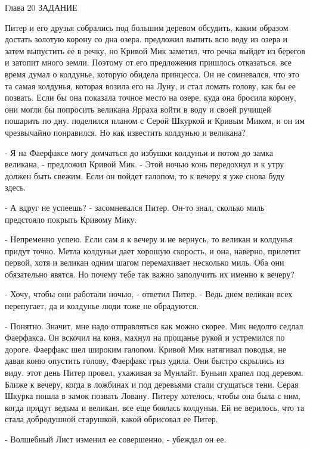 Глава 20
 ЗАДАНИЕ
\par{} Питер и его друзья собрались под большим деревом обсудить, 
каким образом достать золотую корону со дна озера.
 предложил выпить всю воду из озера и затем выпустить ее в 
речку, но Кривой Мик заметил, что речка выйдет из берегов и затопит 
много земли. Поэтому от его предложения пришлось отказаться.
 все время думал о колдунье, которую обидела принцесса. Он не 
сомневался, что это та самая колдунья, которая возила его на Луну, и 
стал ломать голову, как бы ее позвать. Если бы она показала точное 
место на озере, куда она бросила корону, они могли бы попросить 
великана Ярраха войти в воду и своей ручищей пошарить по дну.
 поделился планом с Серой Шкуркой и Кривым Миком, и он им 
чрезвычайно понравился. Но как известить колдунью и великана?
\par- Я на Фаерфаксе могу домчаться до избушки колдуньи и потом до 
замка великана, - предложил Кривой Мик. - Этой ночью конь передохнул и 
к утру должен быть свежим. Если он пойдет галопом, то к вечеру я уже 
снова буду здесь.
\par- А вдруг не успеешь? - засомневался Питер. Он-то знал, сколько 
миль предстояло покрыть Кривому Мику.
\par- Непременно успею. Если сам я к вечеру и не вернусь, то великан и 
колдунья придут точно. Метла колдуньи дает хорошую скорость, и она, 
наверно, прилетит первой, хотя и великан одним шагом перемахивает 
несколько миль. Оба они обязательно явятся. Но почему тебе так важно 
заполучить их именно к вечеру?
\par- Хочу, чтобы они работали ночью, - ответил Питер. - Ведь днем 
великан всех перепугает, да и колдунье люди тоже не обрадуются.
\par- Понятно. Значит, мне надо отправляться как можно скорее.
 Мик недолго седлал Фаерфакса. Он вскочил на коня, махнул на 
прощанье рукой и устремился по дороге. Фаерфакс шел широким галопом. 
Кривой Мик натягивал поводья, не давая коню опустить голову, Фаерфакс 
грыз удила. Они быстро скрылись из виду.
 этот день Питер провел, ухаживая за Мунлайт. Буньип храпел 
под деревом. Ближе к вечеру, когда в ложбинах и под деревьями стали 
сгущаться тени. Серая Шкурка пошла в замок позвать Ловану. Питеру 
хотелось, чтобы она была с ним, когда придут ведьма и великан.
 все еще боялась колдуньи. Ей не верилось, что та стала 
добродушной старушкой, какой обрисовал ее Питер.
\par- Волшебный Лист изменил ее совершенно, - убеждал он ее.
